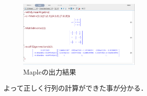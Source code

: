 \begin{figure}[htbp]\begin{center}
\includegraphics[width=6cm,bb=0 0 442 500]{../figs/./mapleruby_eringi.exmaple.png}
\caption{Mapleの出力結果}
\label{default}\end{center}\end{figure}
よって正しく行列の計算ができた事が分かる．

